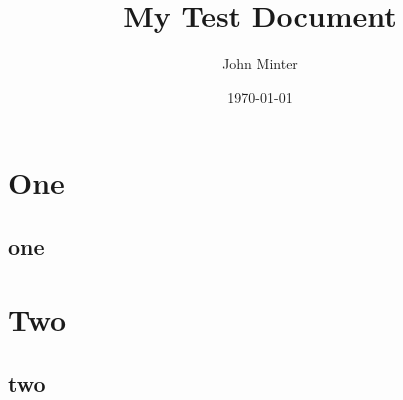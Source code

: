 \documentclass[12pt]{article} %
\title{My Test Document}
\author{John Minter}
\date{\today} %
\begin{document}
\maketitle

\section{One}

\subsection{one}

\section{Two}

\subsection{two}
\end{document}
